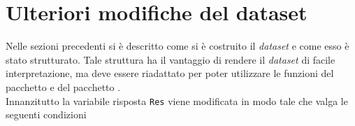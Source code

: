 \begin{comment}
	

\section{Ulteriori modifiche del dataset}

Nelle sezioni precedenti si è descritto come si è costruito il dataset e come esso è stato strutturato. Tale struttura ha il vantaggio di rendere il dataset di facile interpretazione, ma deve essere riadattato per poter utilizzare le funzioni del pacchetto \texttt{BradleyTerry2}.\\ 
Sono state apportare le seguenti modifiche.\\

Innanzitutto il modello richiede che le due variabili \texttt{Team} e \texttt{Vs} siano di tipo fattore oppure costituiscano un \textsf{data.frame}. Un \textsf{data.frame} è una raccolta di vettori di osservazioni, che devono avere tutti la stessa lunghezza, ma possono essere di tipo diverso: variabili nominali (fattori) o variabili numeriche.
Le variabili \textsf{Team} e \textsf{Vs} sono state trasformate in \texttt{data.frame} in modo da poter inserire al loro interno tutte le covariate descritte nella sezione precedente.

Inoltre  i valori della variabile \texttt{AtHome} sono stati converti in 1 (se \texttt{TRUE}) mentre in 0 (se \texttt{FALSE}).

\end{comment}

\section{Ulteriori modifiche del dataset}

Nelle sezioni precedenti si è descritto come si è costruito il \emph{dataset} e come esso è stato strutturato. Tale struttura ha il vantaggio di rendere il \emph{dataset} di facile interpretazione, ma deve essere riadattato per poter utilizzare le funzioni del pacchetto \textit{\cite{bt2}} e del pacchetto \textit{\cite{btl}}.\\ 
Innanzitutto la variabile risposta \texttt{Res} viene modificata in modo tale che valga le seguenti condizioni

